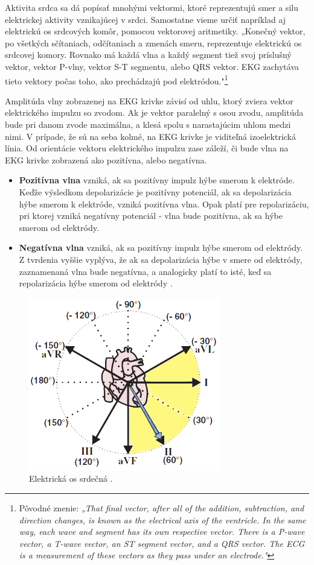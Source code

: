 Aktivita srdca sa dá popísať mnohými vektormi, ktoré reprezentujú smer a silu elektrickej aktivity vznikajúcej v srdci. Samostatne vieme určiť napríklad aj elektrickú os srdcových komôr, pomocou vektorovej aritmetiky. „Konečný vektor, po všetkých sčítaniach, odčítaniach a zmenách smeru, reprezentuje elektrickú os srdcovej komory. Rovnako má každá vlna a každý segment tiež svoj príslušný vektor, vektor P-vlny, vektor S-T segmentu, alebo QRS vektor. EKG zachytáva tieto vektory počas toho, ako prechádzajú pod elektródou."\footnote{Pôvodné znenie: \textit{„That final vector, after all of the addition, subtraction, and direction changes, is known as the electrical axis of the ventricle. In the same way, each wave and segment has its own respective vector. There is a P-wave vector, a T-wave vector, an ST segment vector, and a QRS vector. The ECG is a measurement of these vectors as they pass under an electrode."}} \cite{garcia201512}

Amplitúda vlny zobrazenej na EKG krivke závisí od uhlu, ktorý zviera vektor elektrického impulzu so zvodom. Ak je vektor paralelný s osou zvodu, amplitúda bude pri danom zvode maximálna, a klesá spolu s narastajúcim uhlom medzi nimi. V prípade, že sú na seba kolmé, na EKG krivke je viditeľná izoelektrická línia. Od orientácie vektoru elektrického impulzu zase záleží, či bude vlna na EKG krivke zobrazená ako pozitívna, alebo negatívna. 
 
\begin{itemize}
    \item \textbf{Pozitívna vlna} vzniká, ak sa pozitívny impulz hýbe smerom k elektróde. Keďže výsledkom depolarizácie je pozitívny potenciál, ak sa depolarizácia hýbe smerom k elektróde, vzniká pozitívna vlna. Opak platí pre repolarizáciu, pri ktorej vzniká negatívny potenciál - vlna bude pozitívna, ak sa hýbe smerom od elektródy.
    \item \textbf{Negatívna vlna} vzniká, ak sa pozitívny impulz hýbe smerom od elektródy. Z tvrdenia vyššie vyplýva, že ak sa depolarizácia hýbe v smere od elektródy, zaznamenaná vlna bude negatívna, a analogicky platí to isté, keď sa repolarizácia hýbe smerom od elektródy \cite{garcia201512}\cite{Euan_Niebauer_2004}.
\end{itemize}

\begin{figure}[H]
    \centering
    \includegraphics[scale=0.6]{img/normal-axis.png}
    \caption{Elektrická os srdečná \cite{Blahút_2017b}.}
    \label{fig:axis}
\end{figure}

